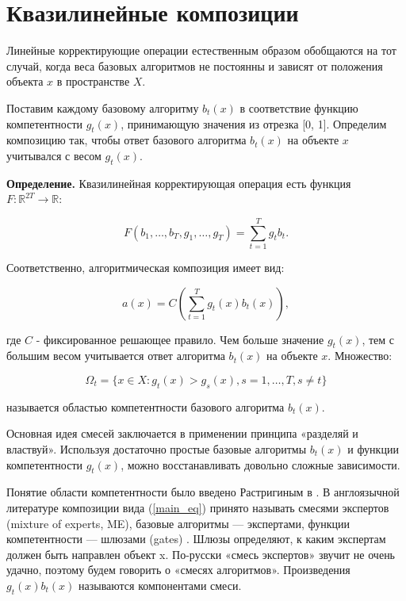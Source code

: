 \section{Квазилинейные композиции}

Линейные корректирующие операции естественным образом обобщаются на тот случай, когда веса базовых алгоритмов не постоянны и зависят от положения объекта $x$ в пространстве $X$.

Поставим каждому базовому алгоритму $b_{t}(x)$ в соответствие функцию компетентности $g_{t}(x)$, принимающую значения из отрезка [0, 1]. Определим композицию так, чтобы ответ базового алгоритма $b_{t}(x)$ на объекте $x$ учитывался с весом $g_{t}(x)$.

\textbf{Определение.} Квазилинейная корректирующая операция есть функция $F: \mathbb{R}^{2T} \rightarrow \mathbb{R}$:

\begin{equation}
    F(b_{1}, \dots, b_{T}, g_{1}, \dots, g_{T}) = \sum_{t=1}^{T}g_{t} b_{t}.
    \label{main_eq}
\end{equation}

Соответственно, алгоритмическая композиция имеет вид:

\begin{equation*}
    a(x) = C(\sum_{t=1}^{T}g_{t}(x)b_{t}(x)),
\end{equation*}

где $C$ - фиксированное решающее правило. Чем больше значение $g_{t}(x)$, тем с большим весом учитывается ответ алгоритма $b_{t}(x)$ на объекте $x$. Множество:

\begin{equation*}
    \Omega_{t} = \{x\in X: g_{t}(x) > g_{s}(x), s = 1, \dots, T, s \neq t\}
\end{equation*}

называется областью компетентности базового алгоритма $b_{t}(x)$.

Основная идея смесей заключается в применении принципа «разделяй и властвуй». Используя достаточно простые базовые алгоритмы $b_{t}(x)$ и функции компетентности $g_{t}(x)$, можно восстанавливать довольно сложные зависимости.

Понятие области компетентности было введено Растригиным в \cite{растригин1981коллективные}. В англоязычной литературе композиции вида (\ref{main_eq}) принято называть смесями экспертов
(mixture of experts, ME), базовые алгоритмы — экспертами, функции компетентности — шлюзами (gates) \cite{jacobs1991adaptive}. Шлюзы определяют, к каким экспертам должен быть
направлен объект x. По-русски «смесь экспертов» звучит не очень удачно, поэтому
будем говорить о «смесях алгоритмов». Произведения $g_{t}(x)b_{t}(x)$ называются компонентами смеси.

